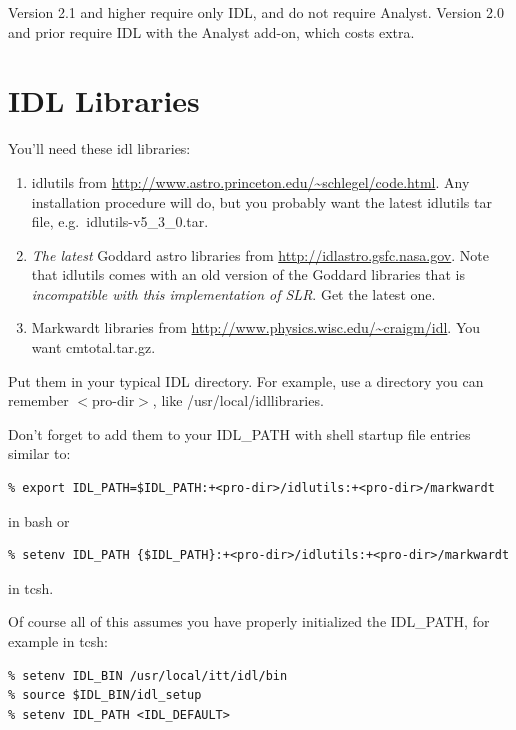 \documentclass{report}
\newcommand{\slr}{SLR}
\begin{document}
Version 2.1 and higher require only IDL, and do not require
Analyst. Version 2.0 and prior require IDL with the Analyst add-on,
which costs extra.


\section{IDL Libraries}

You'll need these idl libraries:

\begin{enumerate}
\item idlutils from
  \url{http://www.astro.princeton.edu/~schlegel/code.html}.  Any
  installation procedure will do, but you probably want the latest
  idlutils tar file, e.g.\ idlutils-v5\_3\_0.tar.
\item {\it The latest} Goddard astro libraries from
  \url{http://idlastro.gsfc.nasa.gov}.  Note that idlutils comes with
  an old version of the Goddard libraries that is {\it incompatible
    with this implementation of SLR}.  Get the latest one.
\item Markwardt libraries from
  \url{http://www.physics.wisc.edu/~craigm/idl}.  You want
  cmtotal.tar.gz.
\end{enumerate}

Put them in your typical IDL directory. For example, use a directory
you can remember $<$pro-dir$>$, like /usr/local/idllibraries.

Don't forget to add them to your IDL\_PATH with shell startup file
entries similar to:
\begin{verbatim}
% export IDL_PATH=$IDL_PATH:+<pro-dir>/idlutils:+<pro-dir>/markwardt
\end{verbatim}
in bash or
\begin{verbatim}
% setenv IDL_PATH {$IDL_PATH}:+<pro-dir>/idlutils:+<pro-dir>/markwardt
\end{verbatim}
in tcsh.

Of course all of this assumes you have properly initialized the
IDL\_PATH, for example in tcsh:
\begin{verbatim}
% setenv IDL_BIN /usr/local/itt/idl/bin
% source $IDL_BIN/idl_setup
% setenv IDL_PATH <IDL_DEFAULT>
\end{verbatim}


\end{document}
